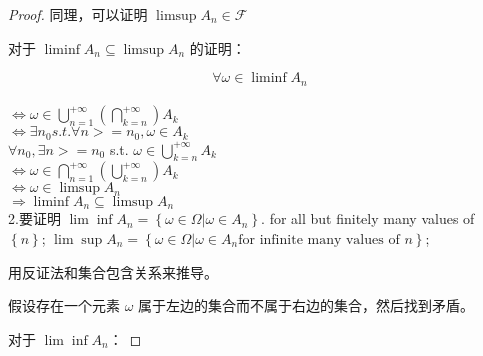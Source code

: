 \documentclass[12pt, a4paper, oneside]{ctexart}
\begin{document}
\begin{proof}
  同理，可以证明 $\limsup A_n \in \mathcal{F}$

  对于 $\liminf A_n \subseteq \limsup A_n$ 的证明：

  $$\forall \omega \in \liminf A_n$$\\
  $\Leftrightarrow \omega \in \bigcup_{n=1}^{+\infty}(\bigcap_{k=n}^{+\infty})A_k  $         \\
  $\Leftrightarrow \exists n_0 s.t. \forall n >= n_0, \omega \in A_k $                        \\
  $ \forall n_0, \exists n >= n_0$ s.t. $\omega \in \bigcup_{k=n}^{+\infty}A_k$ \\
  $\Leftrightarrow \omega \in \bigcap_{n=1}^{+\infty}(\bigcup_{k=n}^{+\infty})A_k     $      \\
  $\Leftrightarrow \omega \in \limsup A_n                             $                      \\
  $ \Rightarrow \liminf A_n \subseteq \limsup A_n$\\


  2.要证明 $\lim \inf A_n=\left \{\omega \in \Omega | \omega \in A_n \right \}.$ for all but finitely many values of $\left \{n\right \}$;
  $\lim \sup A_n=\left \{\omega \in \Omega | \omega \in A_n \text{for infinite many values of } n\right \}$;

  用反证法和集合包含关系来推导。

  假设存在一个元素 $\omega$ 属于左边的集合而不属于右边的集合，然后找到矛盾。

  对于 $\lim \inf A_n$：


\end{proof}
\end{document}
